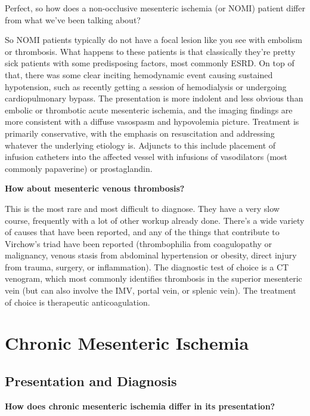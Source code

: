 \documentclass[
]{book}
\begin{document}
Perfect, so how does a non-occlusive mesenteric ischemia (or NOMI)
patient differ from what we've been talking about?

So NOMI patients typically do not have a focal lesion like you see with
embolism or thrombosis. What happens to these patients is that
classically they're pretty sick patients with some predisposing factors,
most commonly ESRD. On top of that, there was some clear inciting
hemodynamic event causing sustained hypotension, such as recently
getting a session of hemodialysis or undergoing cardiopulmonary bypass.
The presentation is more indolent and less obvious than embolic or
thrombotic acute mesenteric ischemia, and the imaging findings are more
consistent with a diffuse vasospasm and hypovolemia picture. Treatment
is primarily conservative, with the emphasis on resuscitation and
addressing whatever the underlying etiology is. Adjuncts to this include
placement of infusion catheters into the affected vessel with infusions
of vasodilators (most commonly papaverine) or prostaglandin.

\textbf{How about mesenteric venous thrombosis?}

This is the most rare and most difficult to diagnose. They have a very
slow course, frequently with a lot of other workup already done. There's
a wide variety of causes that have been reported, and any of the things
that contribute to Virchow's triad have been reported (thrombophilia
from coagulopathy or malignancy, venous stasis from abdominal
hypertension or obesity, direct injury from trauma, surgery, or
inflammation). The diagnostic test of choice is a CT venogram, which
most commonly identifies thrombosis in the superior mesenteric vein (but
can also involve the IMV, portal vein, or splenic vein). The treatment
of choice is therapeutic anticoagulation.

\hypertarget{chronic-mesenteric-ischemia}{%
\section{Chronic Mesenteric Ischemia}\label{chronic-mesenteric-ischemia}}

\hypertarget{presentation-and-diagnosis-2}{%
\subsection{Presentation and Diagnosis}\label{presentation-and-diagnosis-2}}

\textbf{How does chronic mesenteric ischemia differ in its presentation?}
\end{document}
